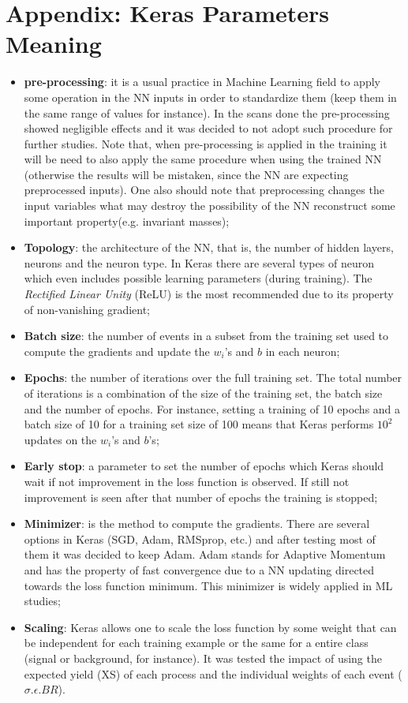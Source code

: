 \documentclass[]{report}
\begin{document}
\section{Appendix: Keras Parameters Meaning}
\begin{itemize}
	\item \textbf{pre-processing}: it is a usual practice in Machine Learning field to apply some operation in the NN inputs in order to standardize them (keep them in the same range of values for instance). In the scans done the pre-processing showed negligible effects and it was decided to not adopt such procedure for further studies. Note that, when pre-processing is applied in the training it will be need to also apply the same procedure when using the trained NN (otherwise the results will be mistaken, since the NN are expecting preprocessed inputs). One also should note that preprocessing changes the input variables what may destroy the possibility of the NN reconstruct some important property(e.g. invariant masses);
	\item \textbf{Topology}: the architecture of the NN, that is, the number of hidden layers, neurons and the neuron type. In Keras there are several types of neuron which even includes possible learning parameters (during training). The \textit{Rectified Linear Unity} (ReLU) is the most recommended due to its property of non-vanishing gradient;
	\item \textbf{Batch size}: the number of events in a subset from the training set used to compute the gradients and update the \textbf{$w_{i}$}'s and \textbf{$b$} in each neuron;
	\item \textbf{Epochs}: the number of iterations over the full training set. The total number of iterations is a combination of the size of the training set, the batch size and the number of epochs. For instance, setting a training of 10 epochs and a batch size of 10 for a training set size of 100 means that Keras performs $10^{2}$ updates on the \textbf{$w_{i}$}'s and \textbf{$b$}'s;
	\item \textbf{Early stop}: a parameter to set the number of epochs which Keras should wait if not improvement in the loss function is observed. If still not improvement is seen after that number of epochs the training is stopped;
	\item \textbf{Minimizer}: is the method to compute the gradients. There are several options in Keras (SGD, Adam, RMSprop, etc.) and after testing most of them it was decided to keep Adam. Adam stands for Adaptive Momentum and has the property of fast convergence due to a NN updating directed towards the loss function minimum. This minimizer is widely applied in ML studies;
	\item \textbf{Scaling}: Keras allows one to scale the loss function by some weight that can be independent for each training example or the same for a entire class (signal or background, for instance). It was tested the impact of using the expected yield (XS) of each process and the individual weights of each event ($\sigma.\epsilon.BR$).
	\end{itemize}
\end{document}
